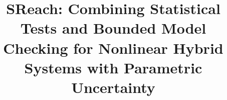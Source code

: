 \documentclass[runningheads,a4paper]{llncs}
\begin{document}
\mainmatter  %

\title{SReach: Combining Statistical Tests and Bounded Model Checking for Nonlinear Hybrid Systems with Parametric Uncertainty}


%
%


%

%
%

\maketitle
\end{document}
